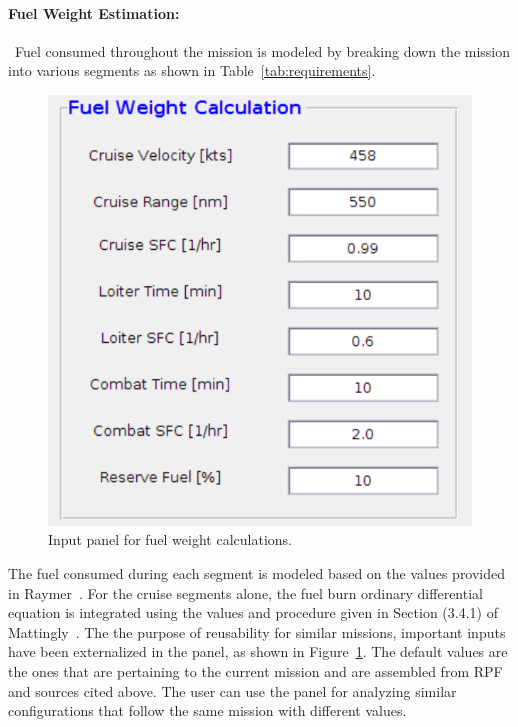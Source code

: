 \documentclass[pdftex,11pt,letter]{article}
\begin{document}
\paragraph{Fuel Weight Estimation:}~Fuel consumed throughout the mission is modeled by breaking down the mission into various segments as shown in Table~\ref{tab:requirements}.
\begin{figure}[h!]
	\centering
	\includegraphics[scale=0.5]{figures/fuel_weight_panel.pdf}
	\caption{Input panel for fuel weight calculations.}
	\label{panel_fuel_weight}
\end{figure}
The fuel consumed during each segment is modeled based on the values provided in Raymer~\cite{RaymerText}. For the cruise segments alone, the fuel burn ordinary differential equation is integrated using the values and procedure given in Section (3.4.1) of Mattingly~\cite{MattinglyText}. The the purpose of reusability for similar missions, important inputs have been externalized in the panel, as shown in Figure~\ref{panel_fuel_weight}. The default values are the ones that are pertaining to the current mission and are assembled from RPF and sources cited above. The user can use the panel for analyzing similar configurations that follow the same mission with different values.
\end{document}
